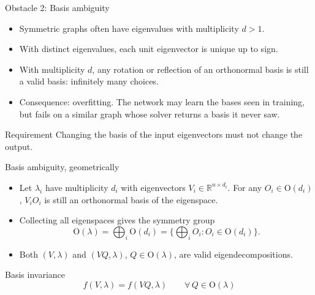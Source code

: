 \documentclass[aspectratio=169,11pt]{beamer}
\newcommand{\R}{\mathbb{R}}
\newcommand{\Orth}{\mathrm{O}}
\begin{document}
\begin{frame}{Obstacle 2: Basis ambiguity}
  \begin{itemize}
    \item Symmetric graphs often have eigenvalues with multiplicity $d > 1$.
    \item With distinct eigenvalues, each unit eigenvector is unique up to sign.
    \item With multiplicity $d$, \alert{any} rotation or reflection of an
          orthonormal basis is still a valid basis: infinitely many choices.
    \item Consequence: \alert{overfitting}. The network may learn the bases seen
          in training, but fails on a similar graph whose solver returns a
          basis it never saw.
  \end{itemize}

  \begin{block}{Requirement}
    Changing the basis of the input eigenvectors must not change the output.
  \end{block}
\end{frame}

\begin{frame}{Basis ambiguity, geometrically}
  \begin{itemize}
    \item Let $\lambda_i$ have multiplicity $d_i$ with eigenvectors
          $V_i \in \R^{n \times d_i}$. For any $O_i \in \Orth(d_i)$,
          $V_i O_i$ is still an orthonormal basis of the eigenspace.
    \item Collecting all eigenspaces gives the symmetry group
          \begin{equation*}
            \Orth(\lambda) = \bigoplus_i \Orth(d_i)
            = \Big\{ \bigoplus_i O_i : O_i \in \Orth(d_i) \Big\}.
          \end{equation*}
    \item Both $(V, \lambda)$ and $(VQ, \lambda)$, $Q \in \Orth(\lambda)$, are
          valid eigendecompositions.
  \end{itemize}

  \begin{block}{Basis invariance}
    \vspace{-1.2em}
    \begin{equation*}
      f(V, \lambda) = f(VQ, \lambda) \qquad \forall\, Q \in \Orth(\lambda)
    \end{equation*}
  \end{block}
\end{frame}
\end{document}

